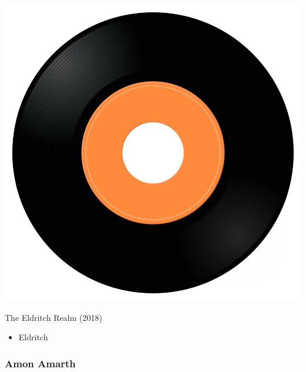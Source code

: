 \begin{minipage}[t]{0.25\textwidth}\vspace{0pt}
\captionsetup{type=figure}
\includegraphics[width=\textwidth]{Images/cover.png}
\caption*{The Eldritch Realm (2018)}
\end{minipage}
\begin{minipage}[t]{0.25\textwidth}\vspace{0pt}
\begin{itemize}[nosep,leftmargin=1em,labelwidth=*,align=left]
	\setlength{\itemsep}{0pt}
	\item Eldritch
\end{itemize}
\end{minipage}

\subsubsection{Amon Amarth}

